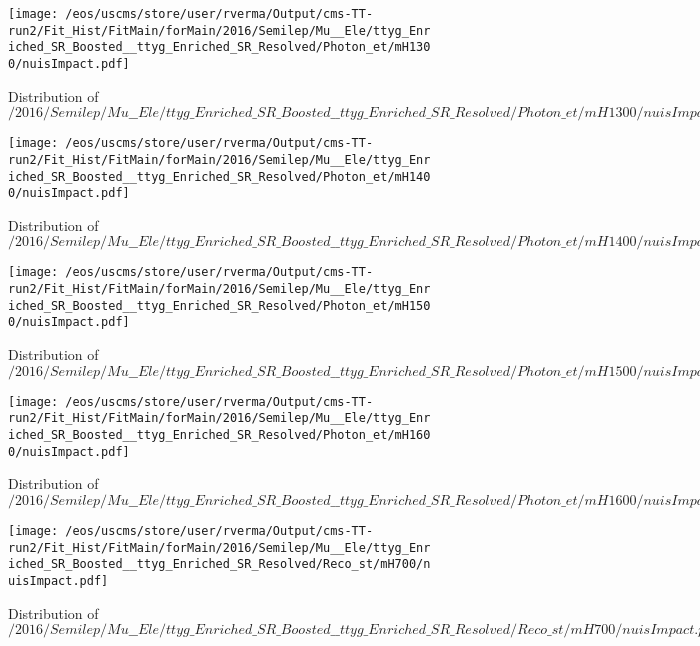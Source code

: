 \begin{figure}
\centering
\texttt{[image: /eos/uscms/store/user/rverma/Output/cms-TT-run2/Fit\_Hist/FitMain/forMain/2016/Semilep/Mu\_\_Ele/ttyg\_Enriched\_SR\_Boosted\_\_ttyg\_Enriched\_SR\_Resolved/Photon\_et/mH1300/nuisImpact.pdf]}
\caption{Distribution of $/2016/Semilep/Mu\_\_Ele/ttyg\_Enriched\_SR\_Boosted\_\_ttyg\_Enriched\_SR\_Resolved/Photon\_et/mH1300/nuisImpact.pdf$}
\end{figure}

\begin{figure}
\centering
\texttt{[image: /eos/uscms/store/user/rverma/Output/cms-TT-run2/Fit\_Hist/FitMain/forMain/2016/Semilep/Mu\_\_Ele/ttyg\_Enriched\_SR\_Boosted\_\_ttyg\_Enriched\_SR\_Resolved/Photon\_et/mH1400/nuisImpact.pdf]}
\caption{Distribution of $/2016/Semilep/Mu\_\_Ele/ttyg\_Enriched\_SR\_Boosted\_\_ttyg\_Enriched\_SR\_Resolved/Photon\_et/mH1400/nuisImpact.pdf$}
\end{figure}

\begin{figure}
\centering
\texttt{[image: /eos/uscms/store/user/rverma/Output/cms-TT-run2/Fit\_Hist/FitMain/forMain/2016/Semilep/Mu\_\_Ele/ttyg\_Enriched\_SR\_Boosted\_\_ttyg\_Enriched\_SR\_Resolved/Photon\_et/mH1500/nuisImpact.pdf]}
\caption{Distribution of $/2016/Semilep/Mu\_\_Ele/ttyg\_Enriched\_SR\_Boosted\_\_ttyg\_Enriched\_SR\_Resolved/Photon\_et/mH1500/nuisImpact.pdf$}
\end{figure}

\begin{figure}
\centering
\texttt{[image: /eos/uscms/store/user/rverma/Output/cms-TT-run2/Fit\_Hist/FitMain/forMain/2016/Semilep/Mu\_\_Ele/ttyg\_Enriched\_SR\_Boosted\_\_ttyg\_Enriched\_SR\_Resolved/Photon\_et/mH1600/nuisImpact.pdf]}
\caption{Distribution of $/2016/Semilep/Mu\_\_Ele/ttyg\_Enriched\_SR\_Boosted\_\_ttyg\_Enriched\_SR\_Resolved/Photon\_et/mH1600/nuisImpact.pdf$}
\end{figure}

\begin{figure}
\centering
\texttt{[image: /eos/uscms/store/user/rverma/Output/cms-TT-run2/Fit\_Hist/FitMain/forMain/2016/Semilep/Mu\_\_Ele/ttyg\_Enriched\_SR\_Boosted\_\_ttyg\_Enriched\_SR\_Resolved/Reco\_st/mH700/nuisImpact.pdf]}
\caption{Distribution of $/2016/Semilep/Mu\_\_Ele/ttyg\_Enriched\_SR\_Boosted\_\_ttyg\_Enriched\_SR\_Resolved/Reco\_st/mH700/nuisImpact.pdf$}
\end{figure}

